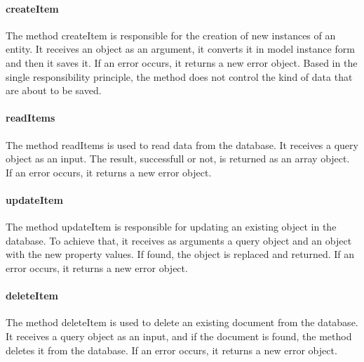 \paragraph{createItem}
The method createItem is responsible for the creation of new instances of an entity. It receives an object as an argument, it converts it in model instance form and then it saves it. If an error occurs, it returns a new error object. Based in the single responsibility principle, the method does not control the kind of data that are about to be saved.
\paragraph{readItems}
The method readItems is used to read data from the database. It receives a query object as an input. The result, successfull or not, is returned as an array object. If an error occurs, it returns a new error object.
\paragraph{updateItem}
The method updateItem is responsible for updating an existing object in the database. To achieve that, it receives as arguments a query object and an object with the new property values. If found, the object is replaced and returned. If an error occurs, it returns a new error object.
\paragraph{deleteItem}
The method deleteItem is used to delete an existing document from the database. It receives a query object as an input, and if the document is found, the method deletes it from the database. If an error occurs, it returns a new error object.


